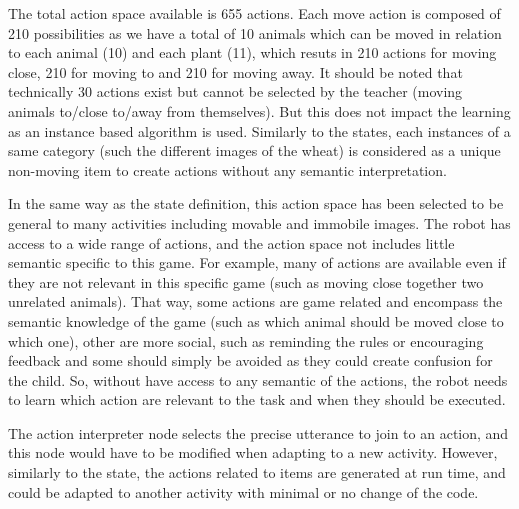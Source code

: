 The total action space available is 655 actions. Each move action is composed of 210 possibilities as we have a total of 10 animals which can be moved in relation to each animal (10) and each plant (11), which resuts in 210 actions for moving close, 210 for moving to and 210 for moving away. It should be noted that technically 30 actions exist but cannot be selected by the teacher (moving animals to/close to/away from themselves). But this does not impact the learning as an instance based algorithm is used. Similarly to the states, each instances of a same category (such the different images of the wheat) is considered as a unique non-moving item to create actions without any semantic interpretation.

In the same way as the state definition, this action space has been selected to be general to many activities including movable and immobile images. The robot has access to a wide range of actions, and the action space not includes little semantic specific to this game. For example, many of actions are available even if they are not relevant in this specific game (such as moving close together two unrelated animals). That way, some actions are game related and encompass the semantic knowledge of the game (such as which animal should be moved close to which one), other are more social, such as reminding the rules or encouraging feedback and some should simply be avoided as they could create confusion for the child. So, without have access to any semantic of the actions, the robot needs to learn which action are relevant to the task and when they should be executed.

The action interpreter node selects the precise utterance to join to an action, and this node would have to be modified when adapting to a new activity. However, similarly to the state, the actions related to items are generated at run time, and could be adapted to another activity with minimal or no change of the code. 



